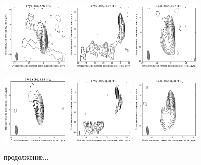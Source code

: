 \begin{figure}
  \includegraphics[width=0.3\textwidth]{1749+096_C.pdf}
  \includegraphics[width=0.3\textwidth]{1745+085_C.pdf}
  \includegraphics[width=0.3\textwidth]{1749+062_C.pdf}


  \includegraphics[width=0.3\textwidth]{1749+096_X.pdf}
  \includegraphics[width=0.3\textwidth]{1745+085_X.pdf}
  \includegraphics[width=0.3\textwidth]{1749+062_X.pdf}

  \caption{продолжение...}
\end{figure}

